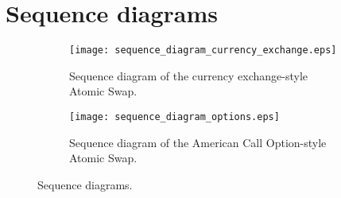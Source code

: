 \newpage

\appendix

\section{Sequence diagrams}

\begin{figure*}[t]
\centering
    \begin{subfigure}{.3\textwidth}
        \texttt{[image: sequence\_diagram\_currency\_exchange.eps]}
        \caption{Sequence diagram of the currency exchange-style Atomic Swap.}
        \label{fig:sequence_diagram_currency_exchange}
    \end{subfigure}
    \quad
    \begin{subfigure}{.3\textwidth}
        \texttt{[image: sequence\_diagram\_options.eps]}
        \caption{Sequence diagram of the American Call Option-style Atomic Swap.}
        \label{fig:sequence_diagram_options}
    \end{subfigure}
\caption{Sequence diagrams.}
\label{fig:sequence_diagrams}
\end{figure*}